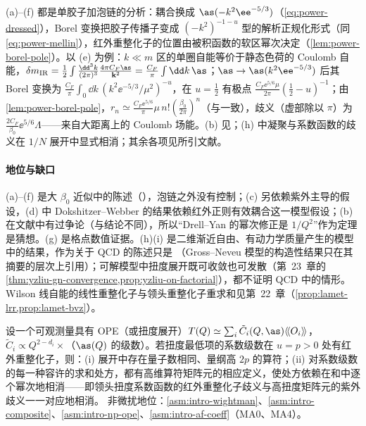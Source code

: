 \begin{proofsketch}
(a)--(f) 都是单胶子加泡链的分析：耦合换成 $\as(-k^2\ee^{-5/3})$（\eqref{eq:power-dressed}），Borel 变换把胶子传播子变成 $(-k^2)^{-1-u}$ 型的解析正规化形式（同\eqref{eq:power-mellin}），红外重整化子的位置由被积函数的软区幂次决定（\cref{lem:power-borel-pole}）。以 (e) 为例：$k\ll m$ 区的单圈自能等价于静态色荷的 Coulomb 自能，$\delta m_{\mathrm{IR}}=\frac12\int\frac{\dd^3k}{(2\pi)^3}\frac{4\pi C_F\as}{\mathbf k^2}=\frac{C_F}{\pi}\int\dd k\,\as$；$\as\to\as(k^2\ee^{-5/3})$ 后其 Borel 变换为 $\frac{C_F}{\pi}\int_0\dd k\,(k^2\ee^{-5/3}/\mu^2)^{-u}$，在 $u=\frac12$ 有极点 $\frac{C_F\ee^{5/6}\mu}{2\pi}(\frac12-u)^{-1}$；由\cref{lem:power-borel-pole}，$r_n\simeq\frac{C_F\ee^{5/6}}{\pi}\mu\,n!(\frac{\beta_0}{2\pi})^n$（与\cite[式~(5.84)]{Beneke1999}一致），歧义（虚部除以 $\pi$）为 $\frac{2C_F}{\beta_0}\ee^{5/6}\Lambda$——来自大距离上的 Coulomb 场能。(b) 见\cite[第~5.3.4~节]{Beneke1999}；(h) 中凝聚与系数函数的歧义在 $1/N$ 展开中显式相消\cite[第~4.1~节]{Beneke1999}；其余各项见所引文献。
\end{proofsketch}

\paragraph{地位与缺口}
(a)--(f) 是大 $\beta_0$ 近似中的陈述（\tagP），泡链之外没有控制；(c) 另依赖紫外主导的假设，(d) 中 Dokshitzer--Webber 的结果依赖红外正则有效耦合这一模型假设；(b) 在文献中有过争论（\cite{Korchemsky:1994is}与\cite{BenekeBraun1995b}结论不同），所以“Drell--Yan 的幂次修正是 $1/Q^2$”作为定理是猜想。(g) 是格点数值证据。(h)(i) 是二维渐近自由、有动力学质量产生的模型中的结果，作为关于 QCD 的陈述只是 \tagP（Gross--Neveu 模型的构造性结果只在其摘要的层次上引用）；可解模型中扭度展开既可收敛也可发散（第~23~章的\cref{thm:yzliu-gn-convergence,prop:yzliu-on-factorial}），都不证明 QCD 中的情形。Wilson 线自能的线性重整化子与领头重整化子重求和见第~22~章（\cref{prop:lamet-lrr,prop:lamet-bvz}）。

\begin{conjecture}\label{conj:power-renormalon-ht}
设一个可观测量具有 OPE（或扭度展开）$T(Q)\simeq\sum_i\tilde C_i(Q,\as)\langle\!\langle O_i\rangle\!\rangle$，$\tilde C_i\propto Q^{2-d_i}\times$（$\as(Q)$ 的级数）。若扭度最低项的系数级数在 $u=p>0$ 处有红外重整化子，则：(i) 展开中存在量子数相同、量纲高 $2p$ 的算符；(ii) 对系数级数的每一种容许的求和处方，都有高维算符矩阵元的相应定义，使处方依赖在和中逐个幂次地相消——即领头扭度系数函数的红外重整化子歧义与高扭度矩阵元的紫外歧义一一对应地相消\cite{Mueller1985,David:1983gz,David:1985xj,Novikov:1984rf,tHooft1979}。
非微扰地位：\cref{asm:intro-wightman}、\cref{asm:intro-composite}、\cref{asm:intro-np-ope}、\cref{asm:intro-af-coeff}（MA0、MA4）。
\end{conjecture}

